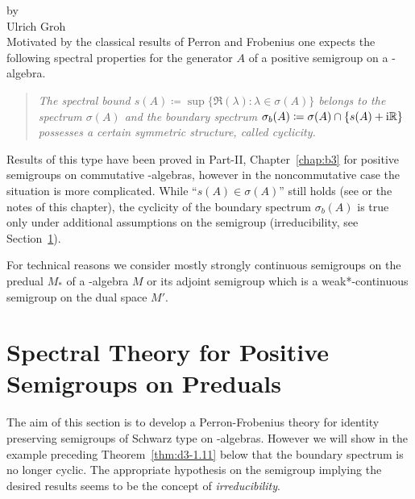 \label{chap:d3}
\thispagestyle{empty}
{\Large
\vspace*{-.75cm}
by \\[.25em]
Ulrich Groh
\vspace{.75cm}
\\
}
Motivated by the classical results of Perron and Frobenius one expects the following spectral properties for the generator $A$ of a positive semigroup on a \CA-algebra.
\begin{quote}
\textit{The spectral bound 
$s(A) \coloneq \sup\{\Re(\lambda) \colon \lambda \in \sigma(A)\}$ belongs to the spectrum $\sigma(A)$ and the boundary spectrum
$  %
\sigma_{b}(A) \coloneq \sigma(A) \cap \{s(A)+\im\R\}
$  %
possesses a certain symmetric structure, called cyclicity.}
\end{quote}
Results of this type have been proved in Part-II, Chapter~\ref{chap:b3} for positive semigroups on commutative \CA-algebras, however in the noncommutative case the situation is more complicated.
While \enquote{$s(A) \in \sigma(A)$} still holds (see \textcite{greinervoigtwolff:1981} or the notes of this chapter), the cyclicity of the boundary spectrum $\sigma_{b}(A)$ is true only under additional assumptions on the semigroup (\eg irreducibility, see Section~\ref{sec:d3-1}).

For technical reasons we consider mostly strongly continuous semigroups on the predual $M_{*}$ of a \WA-algebra $M$ or its adjoint semigroup which is a weak*-continuous semigroup on the dual space $M'$.
\section{Spectral Theory for Positive Semigroups on Preduals}\label{sec:d3-1}
The aim of this section is to develop a Perron-Frobenius theory for identity preserving semigroups of Schwarz type on \WA-algebras.
However we will show in the example preceding Theorem~\ref{thm:d3-1.11} below that the boundary spectrum is no longer cyclic.
The appropriate hypothesis on the semigroup implying the desired results seems to be the concept of \emph{irreducibility}.

